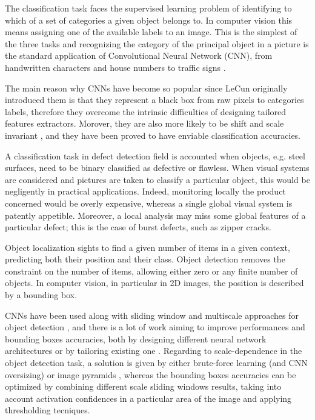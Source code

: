     \par{
        The classification task faces the supervised learning problem of identifying to which of a set of categories a given object belongs to. In computer vision this means assigning one of the available labels to an image. This is the simplest of the three tasks and recognizing the category of the principal object in a picture is the standard application of Convolutional Neural Network (CNN), from handwritten characters \cite{nips:NIPS1989_293, ieee:6248110} and house numbers \cite{ieee:6460867} to traffic signs \cite{ieee:6248110}.

    }
    \par{
        The main reason why CNNs have become so popular since LeCun originally introduced them \cite{nips:NIPS1989_293, ieee:726791, LeCun:1999:ORG:646469.691875, researchgate:deeplearning} is that they represent a black box from raw pixels to categories labels, therefore they overcome the intrinsic difficulties of designing tailored features extractors. Morover, they are also more likely to be shift and scale invariant \cite{LeCun:1999:ORG:646469.691875}, and they have been proved to have enviable classification accuracies.
    }
    \par{
        A classification task in defect detection field is accounted when objects, e.g. steel surfaces, need to be binary classified as defective or flawless. When visual systems are considered and pictures are taken to classify a particular object, this would be negligently in practical applications. Indeed, monitoring locally the product concerned would be overly expensive, whereas a single global visual system is patently appetible. Moreover, a local analysis may miss some global features of a particular defect; this is the case of burst defects, such as zipper cracks.
    }
    \par{
        Object localization sights to find a given number of items in a given context, predicting both their position and their class. Object detection removes the constraint on the number of items, allowing either zero or any finite number of objects. In computer vision, in particular in 2D images, the position is described by a bounding box.
    }
    \par{
        CNNs have been used along with sliding window and multiscale approaches for object detection \cite{ieee:7410526, ieee:7532516, arXiv:1312.6229S}, and there is a lot of work aiming to improve performances and bounding boxes accuracies, both by designing different neural network architectures \cite{ieee:7410526} or by tailoring existing one \cite{ieee:726791}. Regarding to scale-dependence in the object detection task, a solution is given by either brute-force learning (and CNN oversizing) or image pyramids \cite{ieee:7410526}, whereas the bounding boxes accuracies can be optimized by combining different scale sliding windows results, taking into account activation confidences in a particular area of the image and applying thresholding tecniques.
    }
